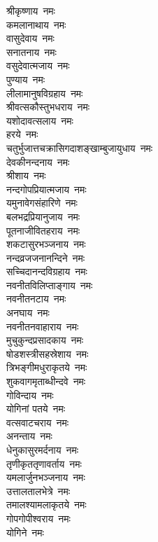\begin{multicols}{2}
\begin{flushleft}
श्रीकृष्णाय~नमः\\
कमलानाथाय~नमः\\
वासुदेवाय~नमः\\
सनातनाय~नमः\\
वसुदेवात्मजाय~नमः\\
पुण्याय~नमः\\
लीलामानुषविग्रहाय~नमः\\
श्रीवत्सकौस्तुभधराय~नमः\\
यशोदावत्सलाय~नमः\\
हरये~नमः\hfill{}\\
चतुर्भुजात्त\-चक्रासि\-गदाशङ्खाम्बुजायुधाय~नमः\\
देवकीनन्दनाय~नमः\\
श्रीशाय~नमः\\
नन्दगोपप्रियात्मजाय~नमः\\
यमुनावेगसंहारिणे~नमः\\
बलभद्रप्रियानुजाय~नमः\\
पूतनाजीवितहराय~नमः\\
शकटासुरभञ्जनाय~नमः\\
नन्दव्रजजनानन्दिने~नमः\\
सच्चिदानन्दविग्रहाय~नमः\hfill{}\\
नवनीतविलिप्ताङ्गाय~नमः\\
नवनीतनटाय~नमः\\
अनघाय~नमः\\
नवनीतनवाहाराय~नमः\\
मुचुकुन्दप्रसादकाय~नमः\\
षोडशस्त्रीसहस्रेशाय~नमः\\
त्रिभङ्गीमधुराकृतये~नमः\\
शुकवागमृताब्धीन्दवे~नमः\\
गोविन्दाय~नमः\\
योगिनां पतये~नमः\hfill{}\\
वत्सवाटचराय~नमः\\
अनन्ताय~नमः\\
धेनुकासुरमर्दनाय~नमः\\
तृणीकृततृणावर्ताय~नमः\\
यमलार्जुनभञ्जनाय~नमः\\
उत्तालतालभेत्रे~नमः\\
तमालश्यामलाकृतये~नमः\\
गोपगोपीश्वराय~नमः\\
योगिने~नमः\\

\end{flushleft}
\end{multicols}
